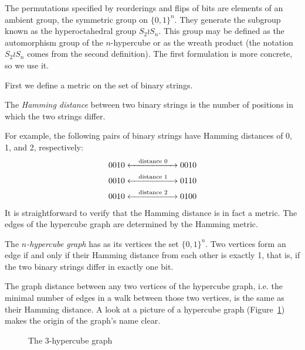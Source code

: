 \documentclass[cclicense]{hmcthesis}
\newcommand*{\x}[1]{\ensuremath{X^{(#1)}}}
\numberwithin{equation}{chapter}
\numberwithin{ucounter}{chapter}
\begin{document}
    The permutations specified by reorderings and flips of bits are elements of
    an ambient group, the symmetric group on $\{0, 1\}^n$.  They generate the
    subgroup known as the hyperoctahedral group $S_2 \wr S_n$.  This group may
    be defined as the automorphism group of the $n$-hypercube or as the wreath
    product (the notation $S_2 \wr S_n$ comes from the second definition).  The
    first formulation is more concrete, so we use it.

    First we define a metric on the set of binary strings.
    \begin{definition}
    The \emph{Hamming distance} between two binary strings is the number of
    positions in which the two strings differ.  
    \end{definition}
    For example, the following pairs of binary strings have Hamming distances
    of 0, 1, and 2, respectively:
    \begin{align*}
        0010 &\xleftrightarrow{\quad\text{distance $0$}\quad} 0010 \\
        0010 &\xleftrightarrow{\quad\text{distance $1$}\quad} 0110 \\
        0010 &\xleftrightarrow{\quad\text{distance $2$}\quad} 0100
    \end{align*}
    It is straightforward to verify that the Hamming distance is in fact a
    metric.  The edges of the hypercube graph are determined by the Hamming
    metric.
    \begin{definition}
        The \emph{$n$-hypercube graph} has as its vertices the set $\{0, 1\}^n$.
        Two vertices form an edge if and only if their Hamming distance from
        each other is exactly 1, that is, if the two binary strings differ in
        exactly one bit.
    \end{definition}
    The graph distance between any two vertices of the hypercube graph, i.e. the
    minimal number of edges in a walk between those two vertices, is the same as
    their Hamming distance.  A look at a picture of a hypercube graph
    (Figure~\ref{fig:hypercube}) makes the origin of the graph's name clear.

    \begin{figure}[h]
        \centering


        \caption{The $3$-hypercube graph}
        \label{fig:hypercube}
    \end{figure}
    
\end{document}
